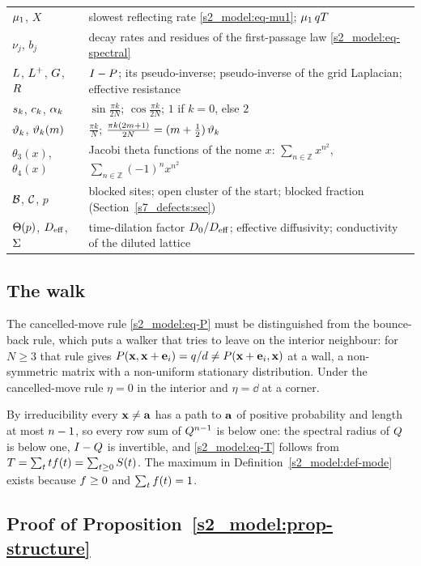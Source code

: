\begin{table}[htb]
\begin{tabular}{@{}ll@{}}
$\mu_{1}$, $X$ & slowest reflecting rate \eqref{s2_model:eq-mu1}; $\mu_{1}\,qT$ \\
$\nu_j$, $b_j$ & decay rates and residues of the first-passage law \eqref{s2_model:eq-spectral} \\
$L$, $L^{+}$, $G$, $R$ & $I-P$; its pseudo-inverse; pseudo-inverse of the grid Laplacian; effective resistance \\
$s_{k}$, $c_{k}$, $\alpha_{k}$ & $\sin\frac{\pi k}{2N}$; $\cos\frac{\pi k}{2N}$; $1$ if $k=0$, else $2$ \\
$\vartheta_{k}$, $\vartheta_{k}(m)$ & $\frac{\pi k}{N}$; $\frac{\pi k(2m+1)}{2N}=(m+\tfrac12)\,\vartheta_{k}$ \\
$\theta_3(x)$, $\theta_4(x)$ & Jacobi theta functions of the nome $x$: $\sum_{n\in\mathbb Z}x^{n^{2}}$, $\sum_{n\in\mathbb Z}(-1)^{n}x^{n^{2}}$ \\
$\mathcal{B}$, $\mathcal{C}$, $p$ & blocked sites; open cluster of the start; blocked fraction (Section~\ref{s7_defects:sec}) \\
$\Theta(p)$, $D_{\mathrm{eff}}$, $\Sigma$ & time-dilation factor $D_{0}/D_{\mathrm{eff}}$; effective diffusivity; conductivity of the diluted lattice \\
\bottomrule
\end{tabular}
\end{table}

\subsection{The walk}

The cancelled-move rule \eqref{s2_model:eq-P} must be distinguished from the bounce-back rule, which puts a walker
that tries to leave on the interior neighbour: for $N\ge3$ that rule gives $P(\mathbf{x},\mathbf{x}+\mathbf{e}_i)=q/d\neq P(\mathbf{x}+\mathbf{e}_i,\mathbf{x})$
at a wall, a non-symmetric matrix with a non-uniform stationary distribution. Under the cancelled-move rule
$\eta=0$ in the interior and $\eta=\dd$ at a corner.

By irreducibility every $\mathbf{x}\neq\mathbf{a}$ has a path to $\mathbf{a}$ of positive probability and length at most $n-1$, so every row
sum of $Q^{n-1}$ is below one: the spectral radius of $Q$ is below one, $I-Q$ is invertible, and
\eqref{s2_model:eq-T} follows from $T=\sum_t tf(t)=\sum_{t\ge0}S(t)$. The maximum in
Definition~\ref{s2_model:def-mode} exists because $f\ge0$ and $\sum_tf(t)=1$.

\subsection{Proof of Proposition~\ref{s2_model:prop-structure}}

